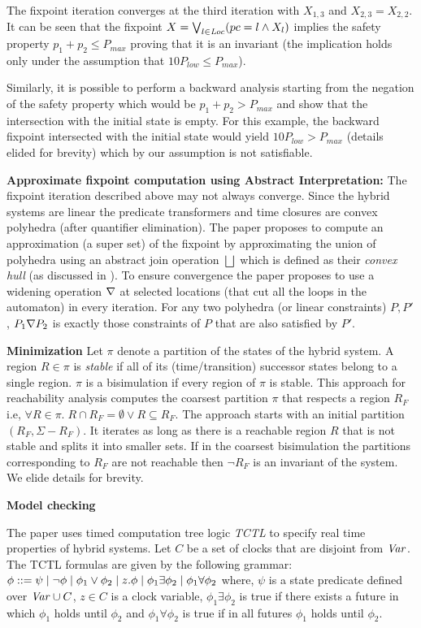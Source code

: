 The fixpoint iteration converges at the third iteration with $X_{1,3}$ and $X_{2,3} = X_{2,2}$. 
It can be seen that the fixpoint $X = \bigvee_{l \in \mathit{Loc}} (pc = l \wedge X_l)$ implies the 
safety property $p_1 + p_2 \le P_{max}$ proving that it is an invariant (the implication holds
only under the assumption that $10P_{low} \le P_{max}$).

Similarly, it is possible to perform a backward analysis starting from the negation of the safety property
which would be $p_1 + p_2 > P_{max}$ and show that the intersection with the initial state is empty.
For this example, the backward fixpoint intersected with the initial state would yield $10 P_{low} > P_{max}$
(details elided for brevity) which by our assumption is not satisfiable.

\textbf{Approximate fixpoint computation using Abstract Interpretation:}
The fixpoint iteration described above may not always converge. Since the hybrid  systems are linear
the predicate transformers and time closures are convex polyhedra (after quantifier elimination).
The paper proposes to compute an approximation (a super set) of the fixpoint by approximating the 
union of polyhedra  using an abstract join operation $\bigsqcup$ which is defined as their \emph{convex hull}
(as discussed in \cite{pcousot:78}).
To ensure convergence the paper proposes to use a widening operation $\nabla$ at selected locations (that cut
all the loops in the automaton) in every iteration. For any two polyhedra (or linear constraints) 
$P,P'$, $P_1 \nabla P_2$  is exactly those constraints of $P$ that are also satisfied by $P'$.

\textbf{Minimization}
Let $\pi$ denote a partition of the states of the hybrid system. A region $R \in \pi$ is \emph{stable} if all of its 
(time/transition) successor states belong to a single region. $\pi$ is a bisimulation if every region of $\pi$
is stable. This approach for reachability analysis computes the coarsest partition $\pi$ that respects
a region $R_F$ i.e, $\forall R \in \pi. \; R \cap R_F = \emptyset \vee R \subseteq R_F$. The approach starts 
with an initial partition $(R_F,\Sigma - R_F)$. It iterates as long as there is a reachable region $R$ that 
is not stable and splits it into smaller sets. If in the coarsest bisimulation the partitions corresponding 
to $R_F$ are not reachable then $\neg R_F$ is an invariant of the system. We elide details for brevity.

\textbf{Model checking}

The paper uses timed computation tree logic \emph{TCTL} to specify real time properties of hybrid systems.
Let $C$ be a set of clocks that are disjoint from $\mathit{Var}$. The TCTL formulas are given by the following grammar: 
$\phi ::= \psi \; | \; \neg \phi \; | \; \phi_1 \vee \phi_2 \; | \; z.\phi \; | \; \phi_1 \exists \phi_2 \; | \; \phi_1 \forall \phi_2$
where, $\psi$ is a state predicate defined over $\mathit{Var} \cup C$, $z \in C$ is a clock variable,
$\phi_1 \exists \phi_2$ is true if there exists a future in which $\phi_1$ holds until $\phi_2$ 
and $\phi_1 \forall \phi_2$ is true if in all futures $\phi_1$ holds until $\phi_2$.

